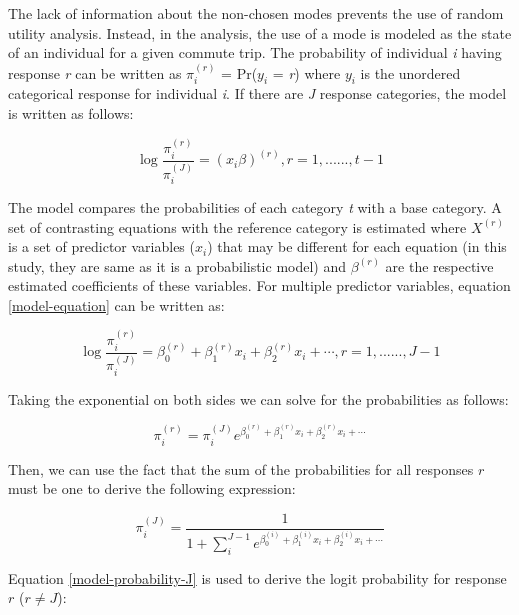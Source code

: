 \documentclass[]{elsarticle} %
\begin{document}
The lack of information about the non-chosen modes prevents the use of
random utility analysis. Instead, in the analysis, the use of a mode is
modeled as the state of an individual for a given commute trip. The
probability of individual \emph{i} having response \emph{r} can be
written as \(\pi^{(r)}_i\) = Pr(\(y_i\) = \emph{r}) where \(y_i\) is the
unordered categorical response for individual \emph{i}. If there are
\emph{J} response categories, the model is written as follows:

\begin{equation}
\label{model-equation}
\log\frac{\pi^{(r)}_i}{\pi^{(J)}_i} = (x_i\beta)^{(r)}, r = 1, ......, t-1            
\end{equation}

The model compares the probabilities of each category \emph{t} with a
base category. A set of contrasting equations with the reference
category is estimated where \(X^{(r)}\) is a set of predictor variables
(\(x_i\)) that may be different for each equation (in this study, they
are same as it is a probabilistic model) and \(\beta^{(r)}\) are the
respective estimated coefficients of these variables. For multiple
predictor variables, equation \ref{model-equation} can be written as:

\begin{equation}
\label{model-equation2}
\log\frac{\pi^{(r)}_i}{\pi^{(J)}_i} = \beta^{(r)}_0 + \beta^{(r)}_1x_i + \beta^{(r)}_2x_i + \cdots, r = 1, ......, J-1      
\end{equation}

Taking the exponential on both sides we can solve for the probabilities
as follows:

\begin{equation}
\label{model-equation3}
\pi^{(r)}_i = \pi^{(J)}_ie^{\beta^{(r)}_0 + \beta^{(r)}_1x_i + \beta^{(r)}_2x_i + \cdots}
\end{equation}

Then, we can use the fact that the sum of the probabilities for all
responses \(r\) must be one to derive the following expression:

\begin{equation}
\label{model-probability-J}
\pi^{(J)}_i = \frac{1}{1+\sum_i^{J-1}e^{\beta^{(i)}_0 + \beta^{(i)}_1x_i + \beta^{(i)}_2x_i + \cdots}}
\end{equation}

Equation \ref{model-probability-J} is used to derive the logit
probability for response \(r\) (\(r \ne J\)):
\end{document}
